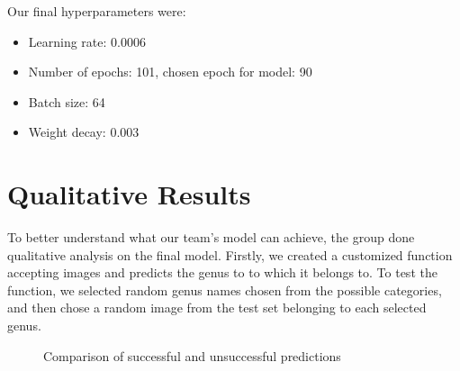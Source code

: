 \documentclass{article} %
\begin{document}
Our final hyperparameters were:
\begin{itemize}
    \item Learning rate: 0.0006
    \item Number of epochs: 101, chosen epoch for model: 90
    \item Batch size: 64
    \item Weight decay: 0.003
\end{itemize}

\section{Qualitative Results}
\label{sec:qualitative_results}

To better understand what our team's model can achieve, the group done qualitative analysis on the final model. Firstly, we created a customized function accepting images and predicts the genus to to which it belongs to. To test the function, we selected random genus names chosen from the possible categories, and then chose a random image from the test set belonging to each selected genus.

\FloatBarrier
\begin{figure}[h]
    \centering
    \hfill
    \caption{Comparison of successful and unsuccessful predictions}
    \label{fig:sideBySideGraphs}
\end{figure}
\FloatBarrier
\end{document}
